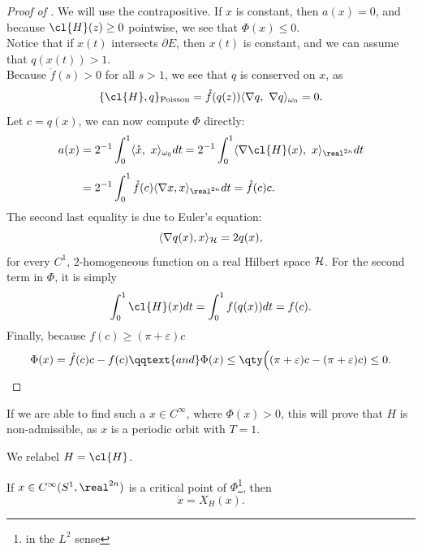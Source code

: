 \documentclass[../main-v2-manifolds.tex]{subfiles}
\begin{document}
\begin{proof}[Proof of ]
    We will use the contrapositive. If $x$ is constant, then $a(x) = 0$, and because $\cl{H}(z)\geq 0$ pointwise, we see that $\Phi(x)\leq 0$.\\

    Notice that if $x(t)$ intersects $\partial E$, then $x(t)$ is constant, and we can assume that $q(x(t))>1$. \\

    Because $\mathring{f}(s)>0$ for all $s>1$, we see that $q$ is conserved on $x$, as
    \[
        \{\cl{H},q\}_{\text{Poisson}} = \mathring{f}(q(z))\langle\nabla q,\ \nabla q\rangle_{\omega_0} = 0.
    \]
    Let $c = q(x)$, we can now compute $\Phi$ directly:
    \begin{align*}
    a(x) &= 2^{-1}\int_0^1 \langle\mathring{x},\ x\rangle_{\omega_0}dt = 2^{-1}\int_0^1 \langle \nabla\cl{H}(x),\ x\rangle_{\realtn}dt\\[1ex]
    &=2^{-1}\int_0^1\mathring{f}(c)\langle\nabla x,x\rangle_{\realtn}dt=\mathring{f}(c)c.
    \end{align*}
    The second last equality is due to Euler's equation:
    \[
        \langle\nabla q(x), x\rangle_{\mathcal{H}} = 2q(x),
    \]
    for every $C^1$, $2$-homogeneous function on a real Hilbert space $\mathcal{H}$. For the second term in $\Phi$, it is simply
    \[
    \int_0^1\cl{H}(x)dt = \int_0^1f(q(x)) dt = f(c).
    \]
    Finally, because $f(c)\geq (\pi + \varepsilon)c$
    \[
        \Phi(x) = \mathring{f}(c)c - f(c)\qqtext{and}\Phi(x)\leq \qty\Big((\pi + \varepsilon)c - (\pi + \varepsilon)c)\leq 0.
    \]
\end{proof}
\begin{remark}
    If we are able to find such a $x\in C^\infty$, where $\Phi(x)>0$, this will prove that $H$ is non-admissible, as $x$ is a periodic orbit with $T = 1$.
\end{remark}
\begin{remark}[Relabelling]
    We relabel $H = \cl{H}$.
\end{remark}
\begin{wts}\label{thm:critical-points-of-phi-informal}
    If $x\in C^\infty(S^1,\realtn)$ is a critical point of $\Phi$\footnote{in the $L^2$ sense}, then 
    \[
        \mathring{x} = X_H(x).
    \]
\end{wts}
\end{document}
